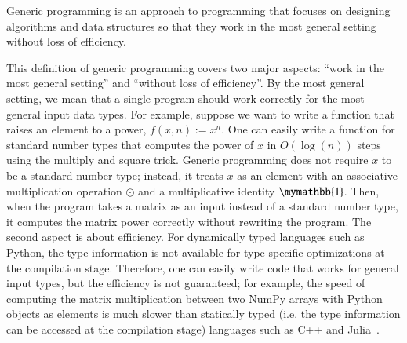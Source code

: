 \documentclass[onefignum, onetabnum]{siamart190516}
\newcommand{\<}{\langle}
\renewcommand{\>}{\rangle}
\newcommand{\blue}[1]{[{\bf  \color{blue}{JG: #1}}]}
\newcommand{\purple}[1]{[{\bf  \color{purple}{MC: #1}}]}
\newcommand{\xpurple}[1]{[{\bf  \color{purple}{\sout{MC: #1}}}]}
\newcounter{example}
\begin{document}
\begin{definition}
   Generic programming is an approach to programming that focuses on designing algorithms and data structures so that they work in the most general setting without loss of efficiency.
\end{definition}
This definition of generic programming covers two major aspects: ``work in the most general setting'' and ``without loss of efficiency''.
By the most general setting, we mean that a single program should work correctly for the most general input data types. 
For example, suppose we want to write a function that raises an element to a power, $f(x, n) := x^n$.
One can easily write a function for standard number types that computes the power of $x$ in $O \left( \log(n) \right)$ steps using the multiply and square trick.
Generic programming does not require $x$ to be a standard number type;
instead, it treats $x$ as an element with an associative multiplication operation $\odot$ and a multiplicative identity $\mymathbb{1}$.
Then, when the program takes a matrix as an input instead of a standard number type, it computes the matrix power correctly without rewriting the program.
The second aspect is about efficiency. For dynamically typed languages such as Python, the type information is not available for type-specific optimizations at the compilation stage.
Therefore, one can easily write code that works for general input types, but the efficiency is not guaranteed; for example, the speed of computing the matrix multiplication between two NumPy arrays with Python objects as elements is much slower than statically typed (i.e. the type information can be accessed at the compilation stage) languages such as C++ and Julia~\cite{Bezanson2012}.
\end{document}
